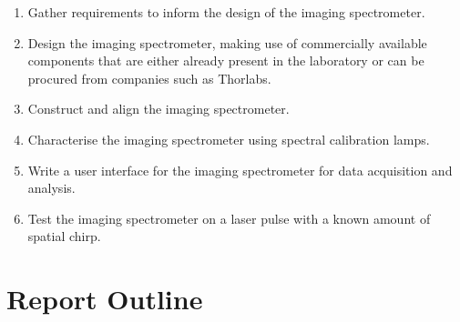 \begin{enumerate}
    \item Gather requirements to inform the design of the imaging spectrometer.
    \item Design the imaging spectrometer, making use of commercially available components that are either
    already present in the laboratory or can be procured from companies such as Thorlabs.
    \item Construct and align the imaging spectrometer.
    \item Characterise the imaging spectrometer using spectral calibration lamps.
    \item Write a user interface for the imaging spectrometer for data acquisition and analysis.
    \item Test the imaging spectrometer on a laser pulse with a known amount of spatial chirp.
\end{enumerate}


\section{Report Outline}
\label{sec:intro-outline}

%
